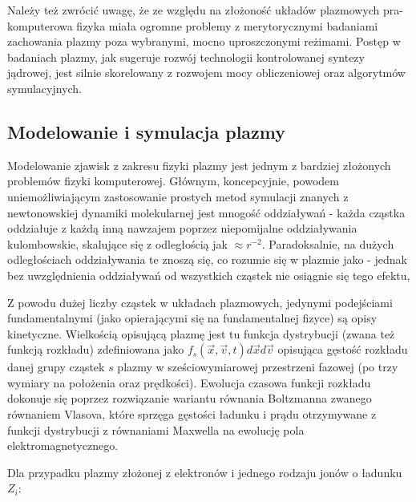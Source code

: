     Należy też zwrócić uwagę, że ze względu na złożoność układów plazmowych
    pra-komputerowa fizyka miała ogromne problemy z merytorycznymi badaniami
    zachowania plazmy poza wybranymi, mocno uproszczonymi reżimami. Postęp w
    badaniach plazmy, jak sugeruje rozwój technologii kontrolowanej syntezy
    jądrowej, jest silnie skorelowany z
    rozwojem mocy obliczeniowej oraz algorytmów symulacyjnych.\cite{youtube-plasma-algorithm-progress}

    \subsection{Modelowanie i symulacja plazmy}

    Modelowanie zjawisk z zakresu fizyki plazmy jest jednym z bardziej
    złożonych problemów fizyki komputerowej. Głównym, koncepcyjnie, powodem
    uniemożliwiającym zastosowanie prostych metod symulacji znanych z
    newtonowskiej dynamiki molekularnej jest mnogość oddziaływań - każda
    cząstka oddziałuje z każdą inną nawzajem poprzez niepomijalne oddziaływania
    kulombowskie, skalujące się z odległością jak
    $\approx r^{-2}$. Paradoksalnie, na dużych odległościach oddziaływania
    te znoszą się, co rozumie się w plazmie jako  - jednak
    bez uwzględnienia oddziaływań od wszystkich cząstek nie osiągnie się tego
    efektu,

    Z powodu dużej liczby cząstek w układach plazmowych, jedynymi podejściami
    fundamentalnymi (jako opierającymi się na fundamentalnej fizyce) są opisy
    kinetyczne. Wielkością opisującą plazmę jest tu funkcja dystrybucji (zwana
    też funkcją rozkładu) zdefiniowana jako $f_s(\vec{x}, \vec{v}, t) d\vec{x}
    d\vec{v}$ opisująca gęstość rozkładu danej grupy cząstek $s$ plazmy w
    sześciowymiarowej przestrzeni fazowej (po trzy wymiary na położenia oraz
    prędkości). Ewolucja czasowa funkcji rozkładu dokonuje się poprzez
    rozwiązanie wariantu równania Boltzmanna zwanego równaniem Vlasova,
    które sprzęga gęstości ładunku i prądu otrzymywane z funkcji dystrybucji
    z równaniami Maxwella na ewolucję pola elektromagnetycznego.

    Dla przypadku plazmy złożonej z elektronów i jednego rodzaju jonów o ładunku $Z_i$:

